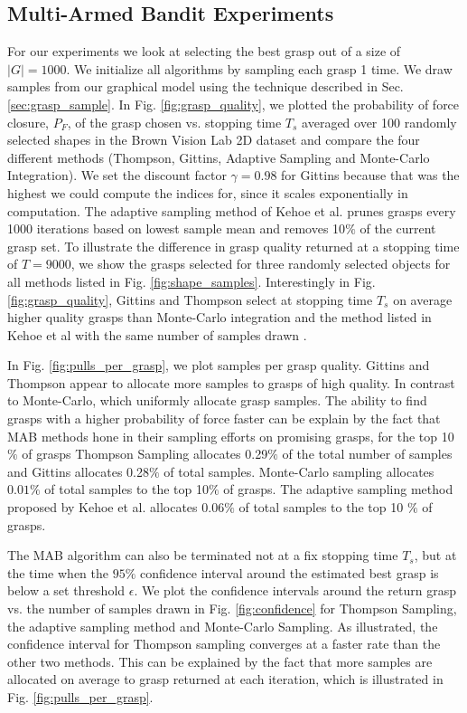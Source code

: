 \documentclass[a4paper, 10pt, conference]{ieeeconf}      %
\begin{document}
\subsection{Multi-Armed Bandit Experiments}
For our experiments we look at selecting the best grasp out of a size of $|G| = 1000$. We initialize all algorithms by sampling each grasp 1 time. We draw samples from our graphical model using the technique described in Sec.  \ref{sec:grasp_sample}. In Fig. \ref{fig:grasp_quality}, we plotted the probability of force closure, $P_F$, of the grasp chosen vs. stopping time $T_s$ averaged over 100 randomly selected shapes in the Brown Vision Lab 2D dataset and compare the four different methods (Thompson, Gittins, Adaptive Sampling \cite{kehoe2012toward} and Monte-Carlo Integration). We set the discount factor $\gamma =0.98$ for Gittins because that was the highest we could compute the indices for, since it scales exponentially in computation. The adaptive sampling method of Kehoe et al. prunes grasps every 1000 iterations based on lowest sample mean and removes 10$\%$ of the current grasp set.  To illustrate the difference in grasp quality returned at a stopping time of $T = 9000$,  we show the grasps selected for three randomly selected objects for all methods listed in Fig. \ref{fig:shape_samples}. Interestingly in Fig. \ref{fig:grasp_quality}, Gittins and Thompson select at stopping time $T_s$ on average higher quality grasps than Monte-Carlo integration and the method listed in Kehoe et al \cite{kehoe2012toward} with the same number of samples drawn .

 In Fig. \ref{fig:pulls_per_grasp}, we plot samples per grasp quality. Gittins and Thompson appear to allocate  more samples to grasps of high quality. In contrast to Monte-Carlo, which uniformly allocate grasp samples. The ability to find grasps with a higher probability of force  faster can be explain by the fact that MAB methods hone in their sampling efforts on promising grasps, for the top 10$\%$ of grasps Thompson Sampling allocates 0.29$\%$ of the total number of samples and Gittins allocates 0.28$\%$ of total samples. Monte-Carlo sampling allocates $0.01\%$ of total samples to the top 10$\%$ of grasps. The adaptive sampling method proposed by Kehoe et al. allocates 0.06$\%$  of total samples to the top 10 $\%$ of grasps. 
 
 The MAB algorithm can also be terminated not at a fix stopping time $T_s$, but at the time when the $95\%$ confidence interval around the estimated best grasp is below a set threshold $\epsilon$. We plot the confidence intervals around the return grasp vs. the number of samples drawn in Fig. \ref{fig:confidence} for Thompson Sampling, the adaptive sampling method\cite{kehoe2012toward} and Monte-Carlo Sampling. As illustrated, the confidence interval for Thompson sampling converges at a faster rate than the other two methods. This can be explained by the fact that more samples are allocated on average to grasp returned at each iteration, which is illustrated in Fig. \ref{fig:pulls_per_grasp}. 
\end{document}
